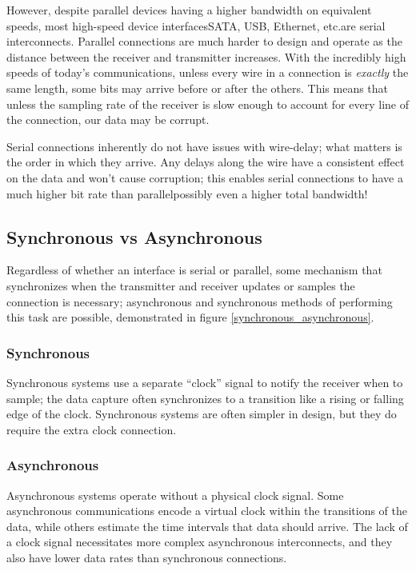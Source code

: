 \documentclass[openany,11pt,fleqn]{book} %
\begin{document}
However, despite parallel devices having a higher bandwidth on equivalent speeds, most high-speed device interfaces\textemdash SATA, USB, Ethernet, etc.\textemdash are serial interconnects. Parallel connections are much harder to design and operate as the distance between the receiver and transmitter increases. With the incredibly high speeds of today's communications, unless every wire in a connection is \textit{exactly} the same length, some bits may arrive before or after the others. This means that unless the sampling rate of the receiver is slow enough to account for every line of the connection, our data may be corrupt.

Serial connections inherently do not have issues with wire-delay; what matters is the order in which they arrive. Any delays along the wire have a consistent effect on the data and won't cause corruption; this enables serial connections to have a much higher bit rate than parallel\textemdash possibly even a higher total bandwidth!

\subsection{Synchronous vs Asynchronous}

Regardless of whether an interface is serial or parallel, some mechanism that synchronizes when the transmitter and receiver updates or samples the connection is necessary; asynchronous and synchronous methods of performing this task are possible, demonstrated in figure \ref{synchronous_asynchronous}.

\subsubsection{Synchronous} 
Synchronous systems use a separate ``clock'' signal to notify the receiver when to sample; the data capture often synchronizes to a transition like a rising or falling edge of the clock. Synchronous systems are often simpler in design, but they do require the extra clock connection.

\subsubsection{Asynchronous}
Asynchronous systems operate without a physical clock signal. Some asynchronous communications encode a virtual clock within the transitions of the data, while others estimate the time intervals that data should arrive. The lack of a clock signal necessitates more complex asynchronous interconnects, and they also have lower data rates than synchronous connections.  
\end{document}
